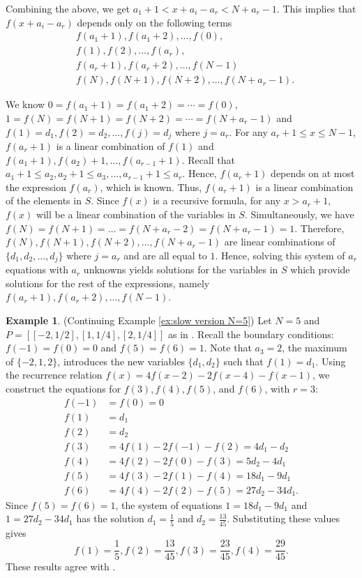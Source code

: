 \documentclass[reqno]{amsart}
\theoremstyle{definition}
\newtheorem{example}{Example}
\theoremstyle{definition}
\theoremstyle{remark}
\begin{document}
Combining the above, we get $a_1+1<x+a_i-a_r<N+a_r-1$. This implies that $f(x+a_i-a_r)$ depends only on the following terms 
\begin{align*}
    &f(a_1+1),f(a_1+2),\ldots, f(0),\\
    &f(1), f(2), \ldots, f(a_r),\\
    &f(a_r+1),f(a_r+2),\ldots, f(N-1)\\
    &f(N), f(N+1), f(N+2), \ldots , f(N+a_r-1).
\end{align*}

We know $0=f(a_1+1)=f(a_1+2)=\cdots =f(0)$, $1=f(N)= f(N+1)=f(N+2)= \cdots =f(N+a_r-1)$ and $f(1)=d_1,f(2)=d_2,\ldots,f(j)=d_j$ where $j=a_r$. For any $a_r+1\leq x \leq N-1$,
$f(a_r+1)$ is a linear combination of $f(1)$ and $f(a_1+1), f(a_2)+1,\ldots, f(a_{r-1}+1)$. Recall that $a_1+1\leq a_2, a_2+1\leq a_3, \ldots, a_{r-1}+1\leq a_r$. Hence, $f(a_r+1)$ depends on at most the expression $f(a_r)$, which is known. Thus, $f(a_r+1)$ is a linear combination of the elements in $S$. Since $f(x)$ is a recursive formula, for any $x>a_r+1$, $f(x)$ will be a linear combination of the variables in $S$. Simultaneously, we have $f(N)=f(N+1)=\ldots =f(N+a_r-2)=f(N+a_r-1)=1$. Therefore, $f(N), f(N+1), f(N+2), \ldots , f(N+a_r-1)$ are linear combinations of $\{d_1,d_2,\ldots,d_j\}$ where $j=a_r$ and are all equal to $1$. Hence, solving this system of $a_r$ equations with $a_r$ unknowns yields solutions for the variables in $S$ which provide solutions for the rest of the expressions, namely $f(a_r+1),f(a_r+2),\ldots, f(N-1)$. 


\begin{example}\label{ex:faster version N=5}(Continuing Example \ref{ex:slow version N=5})
Let $N=5$ and $P=[[-2,1/2],[1,1/4],[2,1/4]]$ as in . Recall the boundary conditions: $f(-1)=f(0)=0$ and  $f(5)=f(6)=1$. Note that $a_3=2$, the maximum of $\{-2,1,2\}$, introduces the new variables $\{d_1,d_2\}$ such that $f(1)=d_1$. Using the recurrence relation  $f(x)=4f(x-2)-2f(x-4)-f(x-1)$, we construct the equations for $f(3), f(4) , f(5)$, and $f(6)$, with $r=3$:
\begin{align*}
    f(-1)&=f(0)=0 \\
    f(1)&=d_1\\
    f(2)&=d_2 \\
    f(3)&=4f(1)-2f(-1)-f(2)= 4d_1-d_2\\
    f(4)&=4f(2)-2f(0)-f(3)=5d_2-4d_1 \\
    f(5)&=4f(3)-2f(1)-f(4)= 18d_1-9d_1\\
    f(6)&=4f(4)-2f(2)-f(5)=27d_2-34d_1.
\end{align*}
Since $f(5)=f(6)=1$, the system of equations $1= 18d_1-9d_1$ and $1=27d_2-34d_1$ has the solution $d_1=\frac{1}{5}$ and $d_2=\frac{13}{45}$. Substituting these values gives  
\[ f(1)=\frac{1}{5}, f(2)=\frac{13}{45}, f(3)=\frac{23}{45}, f(4)=\frac{29}{45}.\]
These results agree with .
\end{example}
\end{document}

